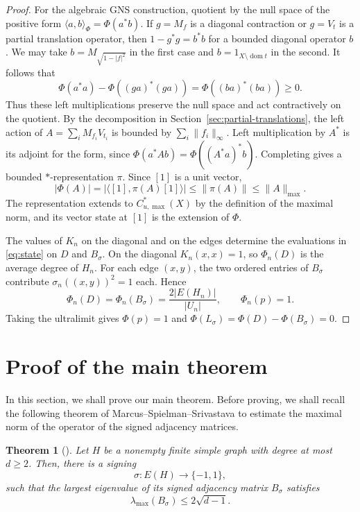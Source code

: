 \documentclass[11pt,a4paper]{article}
\newtheorem{theorem}{Theorem}[section]
\theoremstyle{definition}\newtheorem{definition}[theorem]{Definition}
\theoremstyle{remark}\newtheorem{remark}[theorem]{Remark}
\newcommand{\Cum}{C_{u,\max}^*}
\newcommand{\norm}[1]{\lVert#1\rVert}
\begin{document}
\begin{proof}
For the algebraic GNS construction, quotient by the null space
of the positive form $\langle a,b\rangle_\Phi=\Phi(a^*b)$.
If $g=M_f$ is a diagonal contraction or $g=V_t$ is a partial
translation operator, then $1-g^*g=b^*b$ for a bounded diagonal
operator $b$. We may take $b=M_{\sqrt{1-|f|^2}}$ in the first case
and $b=1_{X\setminus\operatorname{dom}t}$ in the second. It follows that
$$
\Phi(a^*a)-\Phi((ga)^*(ga))=\Phi((ba)^*(ba))\ge0.
$$
Thus these left multiplications preserve the null space and act
contractively on the quotient. By the decomposition in
Section~\ref{sec:partial-translations}, the left action of
$A=\sum_i M_{f_i}V_{t_i}$ is bounded by $\sum_i\norm{f_i}_\infty$.
Left multiplication by $A^*$ is its adjoint for the form, since
$\Phi(a^*Ab)=\Phi((A^*a)^*b)$. Completing gives a bounded
$*$-representation $\pi$. Since $[1]$ is a unit vector,
$$
|\Phi(A)|=|\langle[1],\pi(A)[1]\rangle|
\le \norm{\pi(A)}\le\norm{A}_{\max}.
$$
The representation extends to $\Cum(X)$ by the definition of the
maximal norm, and its vector state at $[1]$ is the extension of $\Phi$.

The values of $K_n$ on the diagonal and on the edges determine
the evaluations in \eqref{eq:state} on $D$ and $B_\sigma$. On the diagonal
$K_n(x,x)=1$, so $\Phi_n(D)$ is the average degree of $H_n$.
For each edge $(x,y)$, the two ordered entries of $B_\sigma$
contribute $\sigma_n((x,y))^2=1$ each. Hence
$$
\Phi_n(D)=\Phi_n(B_\sigma)=\frac{2|E(H_n)|}{|U_n|},
\qquad
\Phi_n(p)=1.
$$
Taking the ultralimit gives $\Phi(p)=1$ and
$\Phi(L_\sigma)=\Phi(D)-\Phi(B_\sigma)=0$.
\end{proof}

\section{Proof of the main theorem}\label{sec:main-proof}
In this section, we shall prove our main theorem. Before proving, we shall recall the following theorem of Marcus--Spielman--Srivastava \cite{MSS} to estimate the maximal norm of the operator of the signed adjacency matrices.
\begin{theorem}[{\cite[Theorems 3.2, 3.7, 4.4 and 5.2]{MSS}}]\label{thm:mss-signing}
Let $H$ be a nonempty finite simple graph with degree at most $d\geq 2$. Then, there is a signing 
$$\sigma:E(H)\to\{-1,1\},$$
such that the largest eigenvalue of its signed adjacency matrix
$B_\sigma$ satisfies
$$
\lambda_{\max}(B_\sigma)\le 2\sqrt{d-1}.
$$
\end{theorem}
\end{document}
